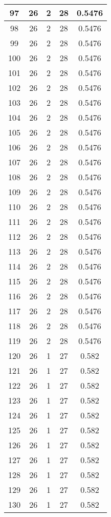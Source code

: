 \documentclass[letterpaper, 12pt]{article}
\begin{document}
\begin{longtable}{|c|c|c|c|c|}
\hline
97 & 26 & 2 & 28 & 0.5476 \\
\hline
98 & 26 & 2 & 28 & 0.5476 \\
\hline
99 & 26 & 2 & 28 & 0.5476 \\
\hline
100 & 26 & 2 & 28 & 0.5476 \\
\hline
101 & 26 & 2 & 28 & 0.5476 \\
\hline
102 & 26 & 2 & 28 & 0.5476 \\
\hline
103 & 26 & 2 & 28 & 0.5476 \\
\hline
104 & 26 & 2 & 28 & 0.5476 \\
\hline
105 & 26 & 2 & 28 & 0.5476 \\
\hline
106 & 26 & 2 & 28 & 0.5476 \\
\hline
107 & 26 & 2 & 28 & 0.5476 \\
\hline
108 & 26 & 2 & 28 & 0.5476 \\
\hline
109 & 26 & 2 & 28 & 0.5476 \\
\hline
110 & 26 & 2 & 28 & 0.5476 \\
\hline
111 & 26 & 2 & 28 & 0.5476 \\
\hline
112 & 26 & 2 & 28 & 0.5476 \\
\hline
113 & 26 & 2 & 28 & 0.5476 \\
\hline
114 & 26 & 2 & 28 & 0.5476 \\
\hline
115 & 26 & 2 & 28 & 0.5476 \\
\hline
116 & 26 & 2 & 28 & 0.5476 \\
\hline
117 & 26 & 2 & 28 & 0.5476 \\
\hline
118 & 26 & 2 & 28 & 0.5476 \\
\hline
119 & 26 & 2 & 28 & 0.5476 \\
\hline
120 & 26 & 1 & 27 & 0.582 \\
\hline
121 & 26 & 1 & 27 & 0.582 \\
\hline
122 & 26 & 1 & 27 & 0.582 \\
\hline
123 & 26 & 1 & 27 & 0.582 \\
\hline
124 & 26 & 1 & 27 & 0.582 \\
\hline
125 & 26 & 1 & 27 & 0.582 \\
\hline
126 & 26 & 1 & 27 & 0.582 \\
\hline
127 & 26 & 1 & 27 & 0.582 \\
\hline
128 & 26 & 1 & 27 & 0.582 \\
\hline
129 & 26 & 1 & 27 & 0.582 \\
\hline
130 & 26 & 1 & 27 & 0.582 \\

\end{longtable}
\end{document}
